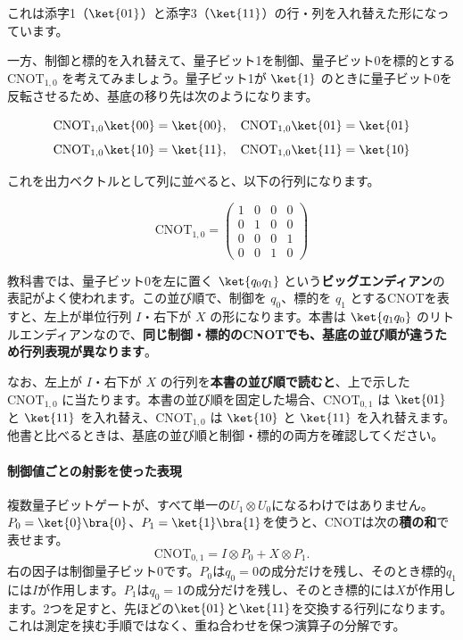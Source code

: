 これは添字1（$\ket{01}$）と添字3（$\ket{11}$）の行・列を入れ替えた形になっています。

一方、制御と標的を入れ替えて、量子ビット1を制御、量子ビット0を標的とする $\mathrm{CNOT}_{1,0}$ を考えてみましょう。量子ビット1が $\ket{1}$ のときに量子ビット0を反転させるため、基底の移り先は次のようになります。

\[
\mathrm{CNOT}_{1,0} \ket{00} = \ket{00}, \quad \mathrm{CNOT}_{1,0} \ket{01} = \ket{01}
\]
\[
\mathrm{CNOT}_{1,0} \ket{10} = \ket{11}, \quad \mathrm{CNOT}_{1,0} \ket{11} = \ket{10}
\]

これを出力ベクトルとして列に並べると、以下の行列になります。

\[
\mathrm{CNOT}_{1,0} = \begin{pmatrix}
1 & 0 & 0 & 0 \\
0 & 1 & 0 & 0 \\
0 & 0 & 0 & 1 \\
0 & 0 & 1 & 0
\end{pmatrix}
\]

教科書では、量子ビット0を左に置く $\ket{q_0q_1}$ という\textbf{ビッグエンディアン}の表記がよく使われます。この並び順で、制御を $q_0$、標的を $q_1$ とするCNOTを表すと、左上が単位行列 $I$・右下が $X$ の形になります。本書は $\ket{q_1q_0}$ のリトルエンディアンなので、\textbf{同じ制御・標的のCNOTでも、基底の並び順が違うため行列表現が異なります}。

なお、左上が $I$・右下が $X$ の行列を\textbf{本書の並び順で読むと}、上で示した $\mathrm{CNOT}_{1,0}$ に当たります。本書の並び順を固定した場合、$\mathrm{CNOT}_{0,1}$ は $\ket{01}$ と $\ket{11}$ を入れ替え、$\mathrm{CNOT}_{1,0}$ は $\ket{10}$ と $\ket{11}$ を入れ替えます。他書と比べるときは、基底の並び順と制御・標的の両方を確認してください。

\paragraph{制御値ごとの射影を使った表現}

複数量子ビットゲートが、すべて単一の$U_1\otimes U_0$になるわけではありません。$P_0=\ket{0}\bra{0}$、$P_1=\ket{1}\bra{1}$を使うと、CNOTは次の\textbf{積の和}で表せます。
\[
\mathrm{CNOT}_{0,1}=I\otimes P_0+X\otimes P_1.
\]
右の因子は制御量子ビット0です。$P_0$は$q_0=0$の成分だけを残し、そのとき標的$q_1$には$I$が作用します。$P_1$は$q_0=1$の成分だけを残し、そのとき標的には$X$が作用します。2つを足すと、先ほどの$\ket{01}$と$\ket{11}$を交換する行列になります。これは測定を挟む手順ではなく、重ね合わせを保つ演算子の分解です。

